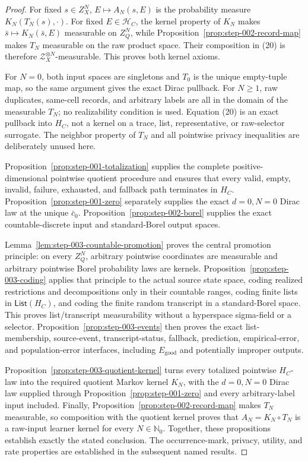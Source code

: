 \begin{proof}
For fixed \(s\in Z_X^N\), \(E\mapsto A_N(s,E)\) is the
probability measure \(K_N(T_N(s),\cdot)\). For fixed
\(E\in\mathcal H_C\), the kernel property of \(K_N\) makes
\(\bar s\mapsto K_N(\bar s,E)\) measurable on \(Z_Q^N\), while Proposition~\ref{prop:step-002-record-map} makes \(T_N\) measurable on the
raw product space. Their composition in (20) is therefore
\(\mathcal Z_X^{\otimes N}\)-measurable. This proves both kernel axioms.

For \(N=0\), both input spaces are singletons and \(T_0\) is the unique
empty-tuple map, so the same argument gives the exact Dirac pullback. For
\(N\ge1\), raw duplicates, same-cell records, and arbitrary labels are all
in the domain of the measurable \(T_N\); no realizability condition is used.
Equation (20) is an exact pullback into \(H_C\), not a kernel on a trace,
list, representative, or raw-selector surrogate. The  neighbor
property of \(T_N\) and all pointwise privacy inequalities are deliberately
unused here.

Proposition~\ref{prop:step-001-totalization} supplies the complete
positive-dimensional pointwise quotient procedure and ensures that every
valid, empty, invalid, failure, exhausted, and fallback path terminates in
\(H_C\). Proposition~\ref{prop:step-001-zero} separately supplies
the exact \(d=0,N=0\) Dirac law at the unique \(\bar c_0\). Proposition~\ref{prop:step-002-borel} supplies the exact countable-discrete
input and standard-Borel output spaces.

Lemma~\ref{lem:step-003-countable-promotion} proves the central promotion
principle: on every \(Z_Q^N\), arbitrary pointwise coordinates are
measurable and arbitrary pointwise Borel probability laws are kernels.
Proposition~\ref{prop:step-003-coding} applies that principle to the actual
source state space, coding realized restrictions and decompositions only in
their countable ranges, coding finite lists in
\(\mathsf{List}(H_C)\), and coding the finite random transcript in a
standard-Borel space. This proves list/transcript measurability without a
hyperspace sigma-field or a selector.
Proposition~\ref{prop:step-003-events} then proves the exact list-membership,
source-event, transcript-status, fallback, prediction, empirical-error, and
population-error interfaces, including \(E_{\mathrm{good}}\) and
potentially improper outputs.

Proposition~\ref{prop:step-003-quotient-kernel} turns every totalized
pointwise \(H_C\)-law into the required quotient Markov kernel \(K_N\), with
the \(d=0,N=0\) Dirac law supplied through Proposition~\ref{prop:step-001-zero} and every arbitrary-label input
included. Finally, Proposition~\ref{prop:step-002-record-map} makes
\(T_N\) measurable, so composition with the quotient kernel proves that
\(A_N=K_N\circ T_N\) is a raw-input learner kernel for every
\(N\in\mathbb N_0\). Together, these propositions establish exactly the
stated conclusion.
The occurrence-mark, privacy, utility, and rate properties are established
in the subsequent named results.



\end{proof}

